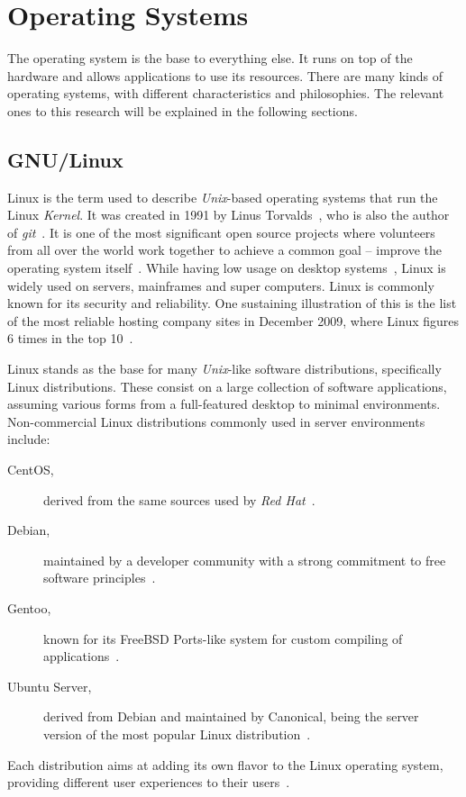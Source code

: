 \section{Operating Systems}
\label{tech:sec:operating_systems}
The operating system is the base to everything else. It runs on top of the hardware and allows applications to use its resources. There are many kinds of operating systems, with different characteristics and philosophies. The relevant ones to this research will be explained in the following sections.

\subsection{GNU/Linux}
Linux is the term used to describe \textit{Unix}-based operating systems that run the Linux \textit{Kernel}. It was created in 1991 by Linus Torvalds~\cite{ linux_kernel_evolution}, who is also the author of \textit{git}~\cite{pro_git}. It is one of the most significant open source projects where volunteers from all over the world work together to achieve a common goal – improve the operating system itself~\cite{ linux_kernel_evolution}. While having low usage on desktop systems~\cite{w3counter}, Linux is widely used on servers, mainframes and super computers. Linux is commonly known for its security and reliability. One sustaining illustration of this is the list of the most reliable hosting company sites in December 2009, where Linux figures 6 times in the top 10~\cite{netcraft_dec2009}.

Linux stands as the base for many \textit{Unix}-like software distributions, specifically Linux distributions. These consist on a large collection of software applications, assuming various forms from a full-featured desktop to minimal environments. Non-commercial Linux distributions commonly used in server environments include:
\begin {description}
\item[CentOS, ] derived from the same sources used by \textit{Red Hat}~\cite{centos}.
\item[Debian,] maintained by a developer community with a strong commitment to free software principles~\cite{debian}.
\item[Gentoo,] known for its FreeBSD Ports-like system for custom compiling of applications~\cite{gentoo}.
\item[Ubuntu Server,] derived from Debian and maintained by Canonical, being the server version of the most popular Linux distribution~\cite{ubuntu_server}.
\end{description}
Each distribution aims at adding its own flavor to the Linux operating system, providing different user experiences to their users~\cite{ tuning_costumizing_linux}.


